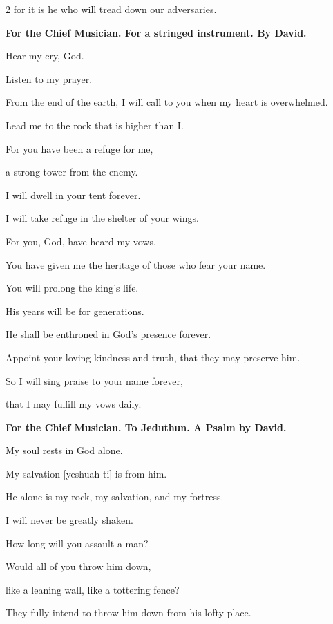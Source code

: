 \begin{multicols}{2}
	for it is he who will tread down our adversaries.
	
	
	\mychapter{}\textbf{For the Chief Musician. For a stringed instrument. By David.}
	
	\myverse*{}Hear my cry, God.
	
	Listen to my prayer.
	
	
	\myverse{}From the end of the earth, I will call to you when my heart is
	overwhelmed.
	
	Lead me to the rock that is higher than I.
	
	
	\myverse{}For you have been a refuge for me,
	
	a strong tower from the enemy.
	
	
	\myverse{}I will dwell in your tent forever.
	
	I will take refuge in the shelter of your wings.
	
	\vspace{\baselineskip}	
	
	
	\myverse{}For you, God, have heard my vows.
	
	You have given me the heritage of those who fear your name.
	
	
	\myverse{}You will prolong the king’s life.
	
	His years will be for generations.
	
	
	\myverse{}He shall be enthroned in God’s presence forever.
	
	Appoint your loving kindness and truth, that they may preserve him.
	
	
	\myverse{}So I will sing praise to your name forever,
	
	that I may fulfill my vows daily.
	
	
	\mychapter{}\textbf{For the Chief Musician. To Jeduthun. A Psalm by David.}
	
	\myverse*{}My soul rests in God alone.
	
	My salvation [yeshuah-ti] is from him.
	
	
	\myverse{}He alone is my rock, my salvation, and my fortress.
	
	I will never be greatly shaken.
	
	
	\myverse{}How long will you assault a man?
	
	Would all of you throw him down,
	
	like a leaning wall, like a tottering fence?
	
	
	\myverse{}They fully intend to throw him down from his lofty place.
	

\end{multicols}
